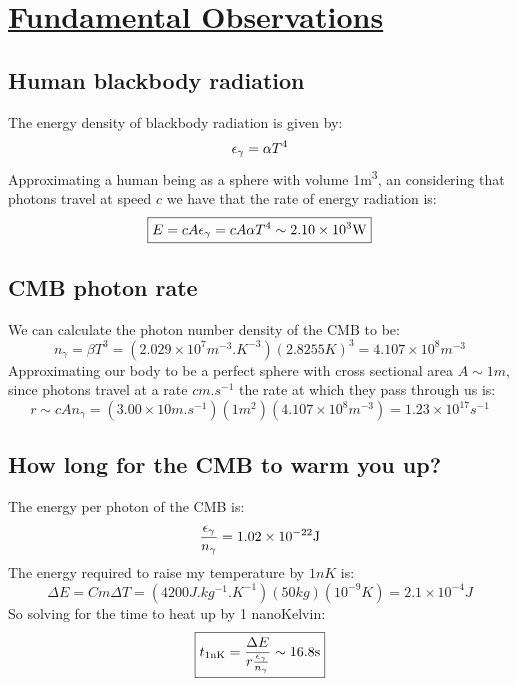 \section[Fundamental Observations]{\hyperlink{toc}{Fundamental Observations}}
\subsection{Human blackbody radiation}
The energy density of blackbody radiation is given by:
\begin{equation}
  \e_\gamma = \alpha T^4
\end{equation}
Approximating a human being as a sphere with volume 1\si{m^3}, an considering that photons travel at speed $c$ we have that the rate of energy radiation is:
\begin{equation}
  \boxed{E = c A \e_\gamma = cA\alpha T^4 \sim 2.10 \times 10^3 \si{W}}
\end{equation} 

\subsection{CMB photon rate}
We can calculate the photon number density of the CMB to be:
\begin{equation}
  n_\gamma = \beta T^3 = (2.029 \times 10^{7}\si{m^{-3}.K^{-3}})(2.8255\si{K})^3 = 4.107 \times 10^8 \si{m^{-3}}
\end{equation}
Approximating our body to be a perfect sphere with cross sectional area $A \sim 1\si{m}$, since photons travel at a rate $c \si{m.s^{-1}}$ the rate at which they pass through us is:
\begin{equation}
  \boxed{r \sim c A n_\gamma = (3.00 \times 10\si{m.s^{-1}})(1\si{m^2})(4.107 \times 10^8 \si{m^{-3}}) = 1.23 \times 10^{17} \si{s^{-1}}}
\end{equation}

\subsection{How long for the CMB to warm you up?}
The energy per photon of the CMB is:
\begin{equation}
  \frac{\e_\gamma}{n_\gamma} = 1.02 \times 10^{-22}\si{J}
\end{equation}
The energy required to raise my temperature by $1\si{nK}$ is:
\begin{equation}
  \Delta E = Cm\Delta T = (4200\si{J.kg^{-1}.K^{-1}})(50\si{kg})(10^{-9}\si{K}) = 2.1 \times 10^{-4}\si{J}
\end{equation}
So solving for the time to heat up by 1 nanoKelvin:
\begin{equation}
  \boxed{t_{1\si{nK}} = \frac{\Delta E}{r\frac{\e_\gamma}{n_\gamma}} \sim 16.8\si{s}}
\end{equation}


